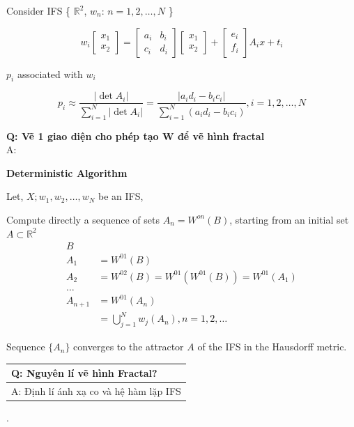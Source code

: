 Consider IFS \{ $\mathbb{R}^2$, $w_n$: $n = 1, 2, \ldots, N$ \}

\begin{equation*}
    w_i 
    \begin{bmatrix}
    x_1\\
    x_2
    \end{bmatrix}
    = 
    \begin{bmatrix}
    a_i & b_i\\
    c_i & d_i
    \end{bmatrix}
    \begin{bmatrix}
    x_1\\
    x_2
    \end{bmatrix}
    +
    \begin{bmatrix}
    e_i\\
    f_i
    \end{bmatrix}
    A_i x + t_i
\end{equation*}

$p_i$ associated with $w_i$

\begin{equation*}
    p_i \approx \frac{|\det A_i|}{\sum_{i=1}^N |\det A_i|} = \frac{|a_i d_i - b_i c_i|}{\sum_{i=1}^N (a_i d_i - b_i c_i)}, i = 1, 2, \ldots, N
\end{equation*}

\textbf{Q: Vẽ 1 giao diện cho phép tạo W để vẽ hình fractal}\\
A:

\textbf{Deterministic Algorithm}

Let, ${X; w_1, w_2, \ldots, w_N}$ be an IFS,

Compute directly a sequence of sets $A_n = W^{on}(B)$, starting from an initial set $A \subset \mathbb{R}^2$
\begin{align*}
    B&\\
    A_1 &= W^{01}(B)\\
    A_2 &= W^{02}(B) = W^{01}(W^{01}(B)) = W^{01}(A_1)\\
    \ldots\\
    A_{n+1} &= W^{01}(A_n)\\
    &= \bigcup_{j=1}^N w_j(A_n), n =1, 2, \ldots
\end{align*}

Sequence $\{A_n\}$ converges to the attractor $A$ of the IFS in the Hausdorff metric.

\begin{table}[H]
    \centering
    \begin{tabular}{|l|}
    \hline
    \textbf{Q: Nguyên lí vẽ hình Fractal?}  \\ \hline
    A: Định lí ánh xạ co và hệ hàm lặp IFS  \\ \hline
    \end{tabular}
\end{table}.

